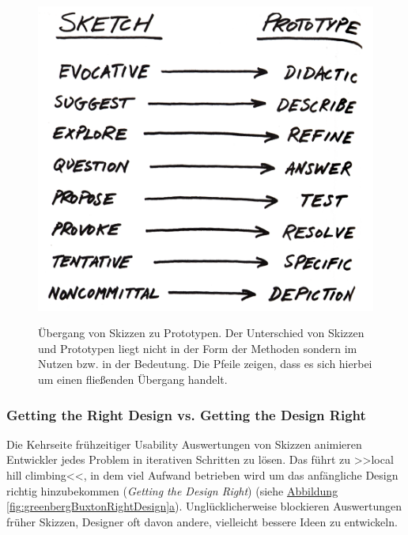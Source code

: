 \begin{figure}
	\begin{center}
        {\includegraphics[width=\linewidth]{gfx/buxtonSketch2prototype}}
	\end{center}
		\caption[Übergang von Skizzen zu Prototypen. \newline \citep{Buxton:2007}]{Übergang von Skizzen zu Prototypen. Der Unterschied von Skizzen und Prototypen liegt nicht in der Form der Methoden sondern im Nutzen bzw. in der Bedeutung. Die Pfeile zeigen, dass es sich hierbei um einen fließenden Übergang handelt.}\label{fig:buxtonSketch2prototype}
\end{figure}

\subsubsection{Getting the Right Design vs. Getting the Design Right} \label{sssec:rightDesign}
Die Kehrseite frühzeitiger Usability Auswertungen von Skizzen animieren Entwickler jedes Problem in iterativen Schritten zu lösen. Das führt zu >>local hill climbing<<, in dem viel Aufwand betrieben wird um das anfängliche Design richtig hinzubekommen (\emph{Getting the Design Right}) (siehe \hyperref[fig:greenbergBuxtonRightDesign]{Abbildung \ref*{fig:greenbergBuxtonRightDesign}a}). Unglücklicherweise blockieren Auswertungen früher Skizzen, Designer oft davon andere, vielleicht bessere Ideen zu entwickeln. \citep{Greenberg:2008}

